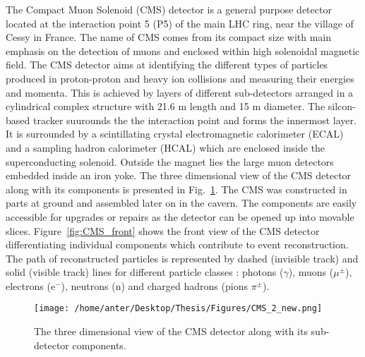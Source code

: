 The Compact Muon Solenoid (CMS) detector is a general purpose detector located at the interaction point 5 (P5) of the main LHC ring, near the village of Cessy in France. The name of CMS comes from its compact size with main emphasis on the detection of muons and enclosed within high solenoidal magnetic field. The CMS detector aims at identifying the different types of particles produced in proton-proton and heavy ion collisions and measuring their energies and momenta. This is achieved by layers of different sub-detectors arranged in a cylindrical complex structure with 21.6 m length and 15 m diameter. The silcon-based tracker suurounds the the interaction point and forms the innermost layer. It is surrounded by a scintillating crystal electromagnetic calorimeter (ECAL) and a sampling hadron calorimeter (HCAL) which are enclosed inside the superconducting solenoid. Outside the magnet lies the large muon detectors embedded inside  an iron yoke. The three dimensional view of the CMS detector along with its components is presented in Fig.~\ref{fig:CMS}. The CMS was constructed in parts at ground and assembled later on in the cavern. The components are easily accessible for upgrades or repairs as the detector can be opened up into movable slices. Figure~\ref{fig:CMS_front} shows the front view of the CMS detector differentiating individual components which contribute to event reconstruction. The path of reconstructed particles is represented by dashed (invisible track) and solid (visible track) lines for different particle classes : photons ($\gamma$), muons ($\mu^{\pm}$), electrons (e$^{-}$), neutrons (n) and charged hadrons (pions $\pi^{\pm}$).
\begin{figure}[!h]
\begin{center}
\vspace{2mm}
\hspace*{-10mm}
\texttt{[image: /home/anter/Desktop/Thesis/Figures/CMS\_2\_new.png]}\\
\vspace*{5mm}
\caption[CMS]{The three dimensional view of the CMS detector along with its sub-detector components.\footnotemark}
\label{fig:CMS}
\end{center}
\end{figure}

